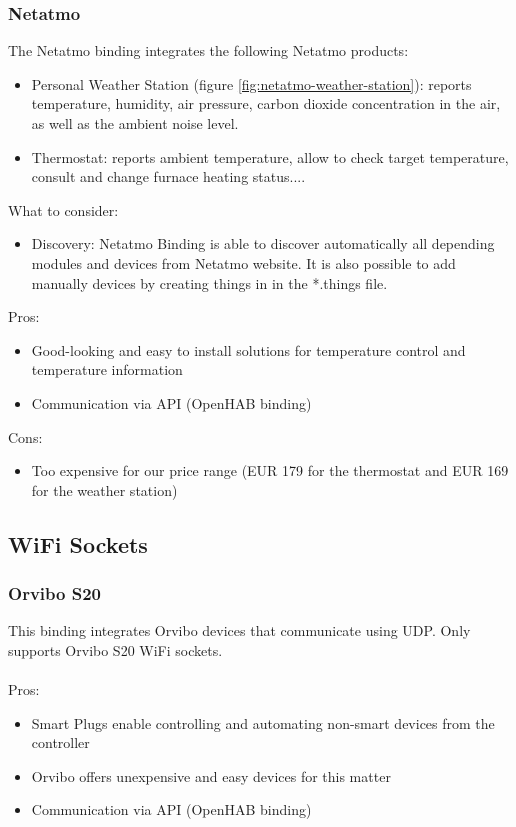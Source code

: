 \subsubsection{Netatmo}
The Netatmo binding integrates the following Netatmo products:
\begin{itemize}
	\item Personal Weather Station (figure \ref{fig:netatmo-weather-station}): reports temperature, humidity, air pressure, carbon 
	dioxide concentration in the air, as well as the ambient noise level.
	\item Thermostat: reports ambient temperature, allow to check target temperature, consult and change furnace heating status....
\end{itemize}
What to consider:
\begin{itemize}
	\item Discovery: Netatmo Binding is able to discover automatically all depending modules and devices from Netatmo website. It is 
	also possible to add manually devices by creating things in in the *.things file.
\end{itemize}
Pros:
\begin{itemize}
	\item Good-looking and easy to install solutions for temperature control and temperature information
	\item Communication via API (OpenHAB binding)
\end{itemize}
Cons:
\begin{itemize}
	\item Too expensive for our price range (EUR 179 for the thermostat and EUR 169 for the weather station)
\end{itemize}

\subsection{WiFi Sockets}

\subsubsection{Orvibo S20}
This binding integrates Orvibo devices that communicate using UDP. Only supports Orvibo S20 WiFi sockets.\\~\\
Pros:
\begin{itemize}
	\item Smart Plugs enable controlling and automating non-smart devices from the controller
	\item Orvibo offers unexpensive and easy devices for this matter
	\item Communication via API (OpenHAB binding)
\end{itemize}

